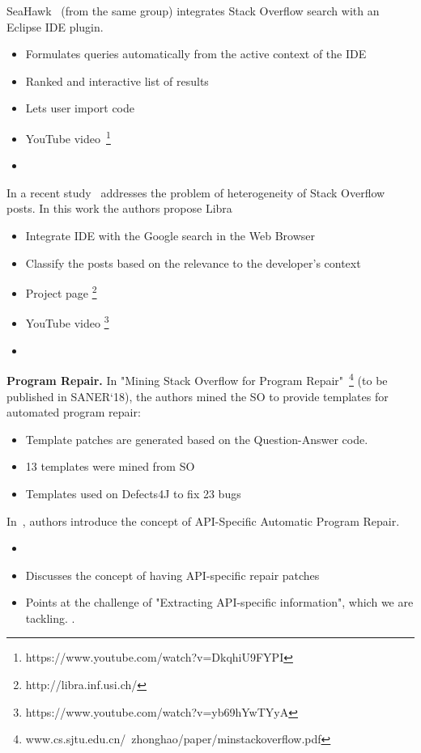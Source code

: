 SeaHawk~\cite{Ponzanelli:2013_SeaHawk} (from the same group) integrates Stack Overflow search with an Eclipse IDE plugin.
\begin{itemize}
	\item Formulates queries automatically from the active context of the IDE
    \item Ranked and interactive list of results
    \item Lets user import code 
    \item YouTube video~\footnote{https://www.youtube.com/watch?v=DkqhiU9FYPI}
    \item {}
\end{itemize}

In a recent study~\cite{Ponzanelli:2017_Holistic} addresses the problem of heterogeneity of Stack Overflow posts. In this work the authors propose Libra
\begin{itemize}
	\item Integrate IDE with the Google search in the Web Browser
    \item Classify the posts based on the relevance to the developer's context
    \item Project page \footnote{http://libra.inf.usi.ch/}
	\item YouTube video \footnote{https://www.youtube.com/watch?v=yb69hYwTYyA}
    \item {}
\end{itemize}

\textbf{Program Repair.} In "Mining Stack Overflow for Program Repair"~\footnote{www.cs.sjtu.edu.cn/~zhonghao/paper/minstackoverflow.pdf} (to be published in SANER`18), the authors mined the SO to provide templates for automated program repair:
\begin{itemize}
	\item Template patches are generated based on the Question-Answer code. 
    \item 13 templates were mined from SO
    \item Templates used on Defects4J to fix 23 bugs
\end{itemize}

In~\cite{Nielebock:2017_TowardsAPIAutomaticProgramRepair}, authors introduce the concept of API-Specific Automatic Program Repair. 
\begin{itemize}
	\item {}
    \item Discusses the concept of having API-specific repair patches
    \item Points at the challenge of "Extracting API-specific information", which we are tackling. .
\end{itemize}

